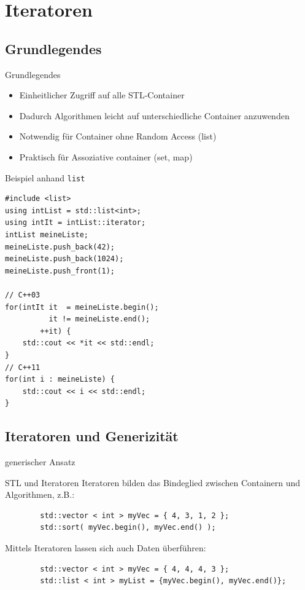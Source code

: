 \section{Iteratoren}


\subsection{Grundlegendes}

\begin{frame}[fragile]{Grundlegendes}
	\begin{itemize}
		\item Einheitlicher Zugriff auf alle STL-Container
		\item Dadurch Algorithmen leicht auf unterschiedliche Container anzuwenden
		\item Notwendig für Container ohne Random Access (list)
		\item Praktisch für Assoziative container (set, map)
	\end{itemize}
\end{frame}

\begin{frame}[fragile]{Beispiel anhand \texttt{list}}
	\begin{lstlisting}[]
#include <list>
using intList = std::list<int>;
using intIt = intList::iterator;
intList meineListe;
meineListe.push_back(42);
meineListe.push_back(1024);
meineListe.push_front(1);

// C++03
for(intIt it  = meineListe.begin();
          it != meineListe.end();
        ++it) {
    std::cout << *it << std::endl;
}
// C++11
for(int i : meineListe) {
    std::cout << i << std::endl;
}
	\end{lstlisting}
\end{frame}


\subsection{Iteratoren und Generizität}

\begin{frame}[t]{generischer Ansatz}
	\onslide*<+> {  }
	\onslide<+-> {  }
\end{frame}

\begin{frame}{STL und Iteratoren}
	Iteratoren bilden das Bindeglied zwischen Containern und Algorithmen, z.B.:
	\begin{lstlisting}
		std::vector < int > myVec = { 4, 3, 1, 2 };
		std::sort( myVec.begin(), myVec.end() );
	\end{lstlisting}
	
	\pause
	Mittels Iteratoren lassen sich auch Daten überführen:
	
	\begin{lstlisting}
		std::vector < int > myVec = { 4, 4, 4, 3 };
		std::list < int > myList = {myVec.begin(), myVec.end()};
	\end{lstlisting}
\end{frame}


